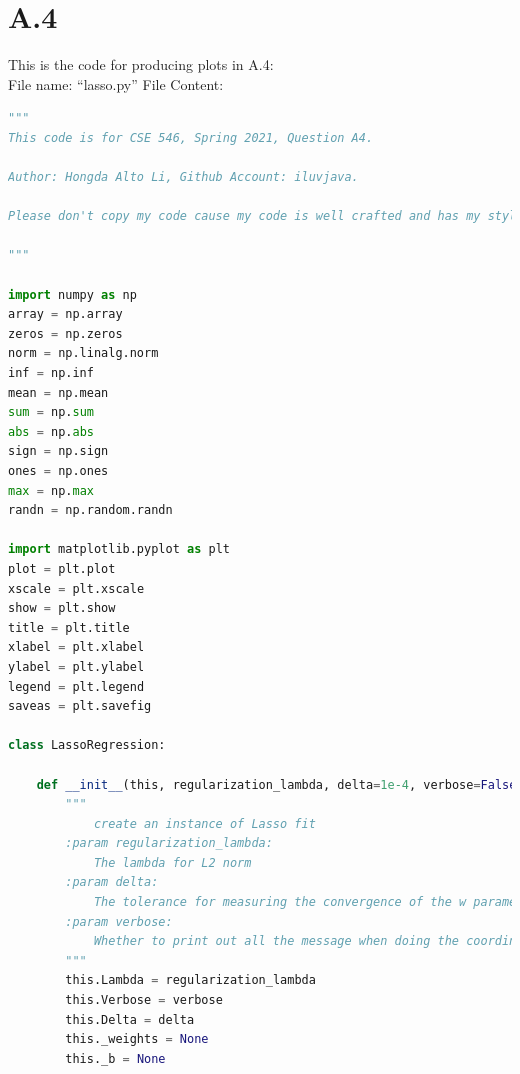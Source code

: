 \documentclass[]{article}
\begin{document}
\section*{A.4}
    This is the code for producing plots in A.4: 
    \\
    File name: ``lasso.py''
    File Content: 
    \begin{lstlisting}[language=python]
"""
This code is for CSE 546, Spring 2021, Question A4.

Author: Hongda Alto Li, Github Account: iluvjava.

Please don't copy my code cause my code is well crafted and has my style in it.

"""

import numpy as np
array = np.array
zeros = np.zeros
norm = np.linalg.norm
inf = np.inf
mean = np.mean
sum = np.sum
abs = np.abs
sign = np.sign
ones = np.ones
max = np.max
randn = np.random.randn

import matplotlib.pyplot as plt
plot = plt.plot
xscale = plt.xscale
show = plt.show
title = plt.title
xlabel = plt.xlabel
ylabel = plt.ylabel
legend = plt.legend
saveas = plt.savefig

class LassoRegression:

    def __init__(this, regularization_lambda, delta=1e-4, verbose=False):
        """
            create an instance of Lasso fit
        :param regularization_lambda:
            The lambda for L2 norm
        :param delta:
            The tolerance for measuring the convergence of the w parameter for coordinate descend.
        :param verbose:
            Whether to print out all the message when doing the coordinate descned.
        """
        this.Lambda = regularization_lambda
        this.Verbose = verbose
        this.Delta = delta
        this._weights = None
        this._b = None


\end{lstlisting}
\end{document}
